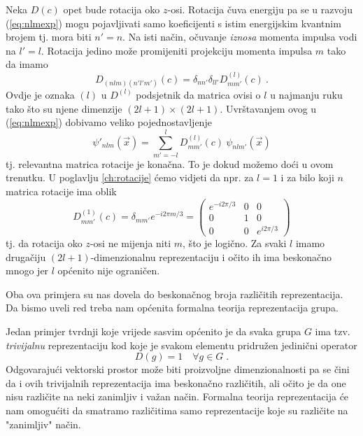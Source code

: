 \begin{primjer}
Neka $D(c)$ opet bude rotacija oko $z$-osi.
Rotacija čuva energiju pa se u razvoju (\ref{eq:nlmexp}) mogu pojavljivati 
samo koeficijenti s istim energijskim kvantnim brojem tj. mora biti $n'=n$. 
Na isti način, očuvanje \emph{iznosa} momenta impulsa vodi na $l'=l$. Rotacija
jedino može promijeniti projekciju momenta impulsa $m$ tako da imamo
\begin{displaymath}
D_{(nlm)(n'l'm')}(c)=\delta_{nn'}\delta_{ll'}D^{(l)}_{mm'}(c) \:.
\end{displaymath}
Ovdje je oznaka $(l)$ u $D^{(l)}$ podsjetnik da matrica ovisi o $l$ u najmanju
ruku tako što su njene dimenzije $(2l+1)\times (2l+1)$. Uvrštavanjem ovog u
(\ref{eq:nlmexp}) dobivamo veliko pojednostavljenje
\begin{displaymath}
\psi'_{nlm}(\vec{x})=  \sum_{m'=-l}^{l} D^{(l)}_{mm'}(c) \: \psi_{nlm'}(\vec{x})
\end{displaymath}
tj. relevantna matrica rotacije je konačna.
To je dokud možemo doći u ovom trenutku. U poglavlju \ref{ch:rotacije} ćemo
vidjeti da npr. za $l=1$ i za bilo koji $n$ matrica rotacije ima oblik
\begin{equation*}
D^{(1)}_{mm'}(c)=\delta_{mm'}e^{ -i 2\pi m/3} =
\begin{pmatrix}
e^{-i2\pi/3} & 0 & 0 \\
0 &  1 & 0 \\
0 & 0 & e^{i 2\pi/3}
\end{pmatrix}
\end{equation*}
tj. da rotacija oko $z$-osi ne mijenja niti $m$, što je logično.
Za svaki $l$ imamo drugačiju $(2l+1)$-dimenzionalnu reprezentaciju i
očito ih ima beskonačno mnogo jer $l$ općenito nije ograničen.
\end{primjer}

Oba ova primjera su nas dovela do beskonačnog broja različitih
reprezentacija.
Da bismo uveli red treba nam općenita formalna teorija reprezentacija grupa.


Jedan primjer tvrdnji koje vrijede sasvim općenito je
da svaka grupa $G$ ima tzv. \emph{trivijalnu} reprezentaciju
kod koje je svakom elementu pridružen jedinični operator
\begin{displaymath}
             D(g)=1 \quad \forall g \in G  \;.
\end{displaymath}
Odgovarajući vektorski prostor može biti proizvoljne
dimenzionalnosti pa se čini da i ovih trivijalnih reprezentacija 
ima beskonačno različitih, ali očito je da one nisu različite
na neki zanimljiv i važan način. Formalna teorija reprezentacija
će nam omogućiti da smatramo različitima samo reprezentacije koje
su različite na "zanimljiv" način.

